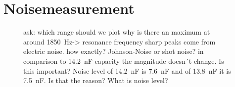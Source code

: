 \section{Noisemeasurement}
\label{sec:Noisemeasurement}



\begin{figure}[H]
    \centering
    
    \caption[]{ask: which range should we plot\newline
    why is there an maximum at around \SI{1850}{Hz}-> resonance frequency\newline
    sharp peaks come from electric noise. how exactly? Johnson-Noise or shot noise?\newline
    in comparison to \SI{14.2}{\nano \farad} capacity the magnitude doesn´t change. Is this important? 
    \newline
    Noise level of \SI{14.2}{\nano \farad} is \SI{7.6}{\nano \farad} and of \SI{13.8}{\nano \farad} it is \SI{7.5}{\nano \farad}. Is that the reason?\newline
    What is noise level?}
    \label{fig:MonitorNoise138}
\end{figure}

\begin{figure}[H]
    \centering
    
    \caption[]{}
    \label{fig:noise}
\end{figure}